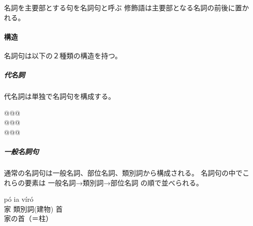 名詞を主要部とする句を名詞句と呼ぶ
修飾語は主要部となる名詞の前後に置かれる。

\paragraph{構造}
名詞句は以下の２種類の構造を持つ。

\subparagraph{代名詞}
代名詞は単独で名詞句を構成する。

\begin{exe}
    \ex \gll @@@\\
    @@@ \\
    \glt @@@
\end{exe}

\subparagraph{一般名詞句}
通常の名詞句は一般名詞、部位名詞、類別詞から構成される。
名詞句の中でこれらの要素は
一般名詞→類別詞→部位名詞
の順で並べられる。

\begin{exe}
    \ex \gll p\'o ia v\'ir\'o \\
        家 類別詞(建物) 首 \\
    \glt 家の首（＝柱）
\end{exe}